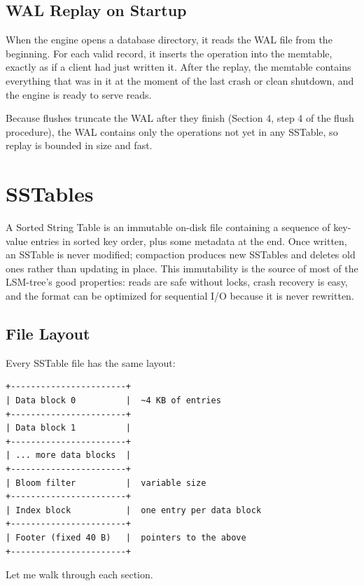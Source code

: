 \documentclass[11pt,a4paper]{article}
\begin{document}
\subsection{WAL Replay on Startup}
When the engine opens a database directory, it reads the WAL file from the beginning. For each valid record, it inserts the operation into the memtable, exactly as if a client had just written it. After the replay, the memtable contains everything that was in it at the moment of the last crash or clean shutdown, and the engine is ready to serve reads.

Because flushes truncate the WAL after they finish (Section 4, step 4 of the flush procedure), the WAL contains only the operations not yet in any SSTable, so replay is bounded in size and fast.

\section{SSTables}

A Sorted String Table is an immutable on-disk file containing a sequence of key-value entries in sorted key order, plus some metadata at the end. Once written, an SSTable is never modified; compaction produces new SSTables and deletes old ones rather than updating in place. This immutability is the source of most of the LSM-tree's good properties: reads are safe without locks, crash recovery is easy, and the format can be optimized for sequential I/O because it is never rewritten.

\subsection{File Layout}
Every SSTable file has the same layout:

\begin{codebox}
\begin{lstlisting}
+-----------------------+
| Data block 0          |  ~4 KB of entries
+-----------------------+
| Data block 1          |
+-----------------------+
| ... more data blocks  |
+-----------------------+
| Bloom filter          |  variable size
+-----------------------+
| Index block           |  one entry per data block
+-----------------------+
| Footer (fixed 40 B)   |  pointers to the above
+-----------------------+
\end{lstlisting}
\end{codebox}

Let me walk through each section.
\end{document}
